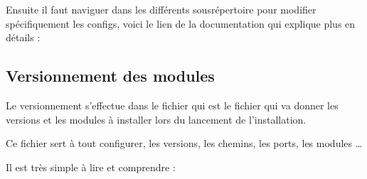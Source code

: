 \documentclass[letterpaper,10pt,french]{sphinxmanual}
\begin{document}
\sphinxAtStartPar
Ensuite il faut naviguer dans les différents sous\sphinxhyphen{}répertoire pour modifier spécifiquement les configs, voici le lien
de la documentation qui explique plus en détails : 


\subsection{Versionnement des modules}
\label{\detokenize{doc_instal/configuration:versionnement-des-modules}}
\sphinxAtStartPar
Le versionnement s’effectue dans le fichier  qui est le fichier qui va donner les versions et les modules à installer
lors du lancement de l’installation.

\sphinxAtStartPar
Ce fichier sert à tout configurer, les versions, les chemins, les ports, les modules …

\sphinxAtStartPar
Il est très simple à lire et comprendre :
\end{document}
